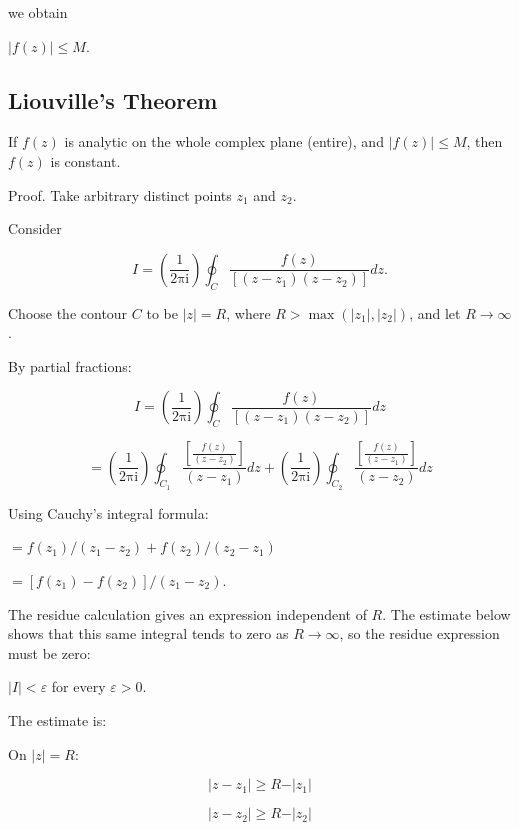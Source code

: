 \documentclass[11pt,a4paper]{article}
\theoremstyle{definition}
\theoremstyle{plain}
\begin{document}
we obtain

$\vert{}f(z)\vert{} \le M$.

\subsection{Liouville's Theorem}

If $f(z)$ is analytic on the whole complex plane (entire), and $\vert{}f(z)\vert{} \le M$, then $f(z)$ is constant.

Proof. Take arbitrary distinct points $z_{1}$ and $z_{2}$.

Consider

\begin{equation}
I = \left(\frac{1}{2\mathrm{\pi}\mathrm{i}}\right)\oint_{C}\frac{f(z)}{[(z - z_{1})(z - z_{2})]}dz.
\end{equation}

Choose the contour $C$ to be $\vert{}z\vert{} = R$, where $R > \max(\vert{}z_{1}\vert{}, \vert{}z_{2}\vert{})$, and let $R \to \infty$.

By partial fractions:

\begin{equation}
I = \left(\frac{1}{2\mathrm{\pi}\mathrm{i}}\right)\oint_{C}\frac{f(z)}{[(z - z_{1})(z - z_{2})]}dz
\end{equation}

\[
= \left(\frac{1}{2\mathrm{\pi}\mathrm{i}}\right)\oint_{C_{1}}\frac{[\frac{f(z)}{(z - z_{2})}]}{(z - z_{1})}dz + \left(\frac{1}{2\mathrm{\pi}\mathrm{i}}\right)\oint_{C_{2}}\frac{[\frac{f(z)}{(z - z_{1})}]}{(z - z_{2})}dz
\]

Using Cauchy's integral formula:

$= f(z_{1})/(z_{1} - z_{2}) + f(z_{2})/(z_{2} - z_{1})$

$= [f(z_{1}) - f(z_{2})]/(z_{1} - z_{2})$.

The residue calculation gives an expression independent of $R$. The estimate below shows that this same integral tends to zero as $R \to \infty$, so the residue expression must be zero:

$\vert{}I\vert{} < \varepsilon$ for every $\varepsilon > 0$.

The estimate is:

On $\vert{}z\vert{} = R$:

\begin{equation}
\vert{}z - z_{1}\vert{} \ge R - \vert{}z_{1}\vert{}
\end{equation}

\[
\vert{}z - z_{2}\vert{} \ge R - \vert{}z_{2}\vert{}
\]
\end{document}
